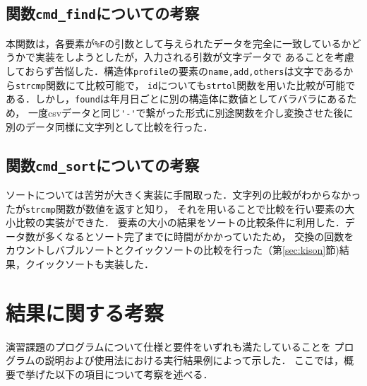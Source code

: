\documentclass[a4j,11pt]{jarticle}
\begin{document}
\subsection{関数\texttt{cmd\_find}についての考察}
本関数は，各要素が\verb|%F|の引数として与えられたデータを完全に一致しているかどうかで実装をしようとしたが，入力される引数が文字データで
あることを考慮しておらず苦悩した．構造体\verb|profile|の要素の\verb|name,add,others|は文字であるから\verb|strcmp|関数にて比較可能で，
\verb|id|についても\verb|strtol|関数を用いた比較が可能である．しかし，\verb|found|は年月日ごとに別の構造体に数値としてバラバラにあるため，
一度csvデータと同じ\verb|'-'|で繋がった形式に別途関数を介し変換させた後に別のデータ同様に文字列として比較を行った．

\subsection{関数\texttt{cmd\_sort}についての考察}
ソートについては苦労が大きく実装に手間取った．文字列の比較がわからなかったが\verb|strcmp|関数が数値を返すと知り，
それを用いることで比較を行い要素の大小比較の実装ができた．
要素の大小の結果をソートの比較条件に利用した．データ数が多くなるとソート完了までに時間がかかっていたため，
交換の回数をカウントしバブルソートとクイックソートの比較を行った（第\ref{sec:kison}節)結果，クイックソートも実装した．

\section{結果に関する考察}


演習課題のプログラムについて仕様と要件をいずれも満たしていることを
プログラムの説明および使用法における実行結果例によって示した．
ここでは，概要で挙げた以下の項目について考察を述べる．
\end{document}
